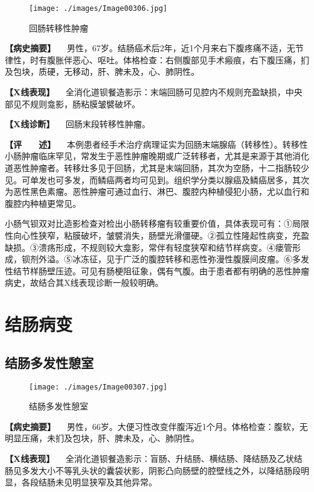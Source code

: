 \begin{figure}[!htbp]
 \centering
 \texttt{[image: ./images/Image00306.jpg]}
 \captionsetup{justification=centering}
 \caption{回肠转移性肿瘤}
 \label{fig5-5-10}
  \end{figure} 

\textbf{【病史摘要】}
　男性，67岁。结肠癌术后2年，近1个月来右下腹疼痛不适，无节律性，时有腹胀伴恶心、呕吐。体格检查：右侧腹部见手术瘢痕，右下腹压痛，扪及包块，质硬，无移动，肝、脾未及，心、肺阴性。

\textbf{【X线表现】}
　全消化道钡餐造影示：末端回肠可见腔内不规则充盈缺损，中央部见不规则龛影，肠粘膜皱襞破坏。

\textbf{【X线诊断】} 　回肠末段转移性肿瘤。

\textbf{【评　　述】}
　本例患者经手术治疗病理证实为回肠末端腺癌（转移性）。转移性小肠肿瘤临床罕见，常发生于恶性肿瘤晚期或广泛转移者，尤其是来源于其他消化道恶性肿瘤者。转移灶多见于回肠，尤其是末端回肠，其次为空肠，十二指肠较少见。可单发也可多发，而鳞癌两者均可见到。组织学分类以腺癌及鳞癌居多，其次为恶性黑色素瘤。恶性肿瘤可通过血行、淋巴、腹腔内种植侵犯小肠，尤以血行和腹腔内种植更常见。

小肠气钡双对比造影检查对检出小肠转移瘤有较重要价值，具体表现可有：①局限性向心性狭窄，粘膜破坏，皱襞消失，肠壁光滑僵硬。②孤立性隆起性病变，充盈缺损。③溃疡形成，不规则较大龛影，常伴有轻度狭窄和结节样病变。④瘘管形成，钡剂外溢。⑤冰冻征，见于广泛的腹腔转移和恶性弥漫性腹膜间皮瘤。⑥多发性结节样肠壁压迹。可见有肠梗阻征象，偶有气腹。由于患者都有明确的恶性肿瘤病史，故结合其X线表现诊断一般较明确。

\section{结肠病变}

\subsection{结肠多发性憩室}

\begin{figure}[!htbp]
 \centering
 \texttt{[image: ./images/Image00307.jpg]}
 \captionsetup{justification=centering}
 \caption{结肠多发性憩室}
 \label{fig5-6-1}
  \end{figure} 

\textbf{【病史摘要】}
　男性，66岁。大便习性改变伴腹泻近1个月。体格检查：腹软，无明显压痛，未扪及包块，肝、脾未及，心、肺阴性。

\textbf{【X线表现】}
　全消化道钡餐造影示：盲肠、升结肠、横结肠、降结肠及乙状结肠见多发大小不等乳头状的囊袋状影，阴影凸向肠壁的腔壁线之外，以降结肠段明显，各段结肠未见明显狭窄及其他异常。

